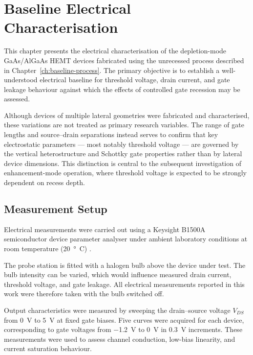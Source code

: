 \chapter{Baseline Electrical Characterisation}
\label{ch:baseline-electrical}

This chapter presents the electrical characterisation of the depletion-mode
GaAs/AlGaAs HEMT devices fabricated using the unrecessed process described
in Chapter~\ref{ch:baseline-process}. The primary objective is to establish
a well-understood electrical baseline for threshold voltage, drain current,
and gate leakage behaviour against which the effects of controlled gate
recession may be assessed.

\vspace{2mm}

Although devices of multiple lateral geometries were fabricated and
characterised, these variations are not treated as primary research variables.
The range of gate lengths and source--drain separations instead serves to
confirm that key electrostatic parameters --- most notably threshold voltage ---
are governed by the vertical heterostructure and Schottky gate properties
rather than by lateral device dimensions. This distinction is central to the
subsequent investigation of enhancement-mode operation, where threshold voltage
is expected to be strongly dependent on recess depth.

\section{Measurement Setup}
\label{sec:measurement-setup}

Electrical measurements were carried out using a Keysight B1500A
semiconductor device parameter analyser under ambient laboratory conditions at
room temperature (\SI{20}{\degree C}) \cite{leedscleanroom_equipment}.

\vspace{2mm}

The probe station is fitted with a halogen bulb above the device under test.
The bulb intensity can be varied, which would influence measured drain current,
threshold voltage, and gate leakage. All electrical measurements reported in
this work were therefore taken with the bulb switched off.

\vspace{2mm}

Output characteristics were measured by sweeping the drain--source voltage
$V_{DS}$ from \SI{0}{\volt} to \SI{5}{\volt} at fixed gate biases. Five curves
were acquired for each device, corresponding to gate voltages from
\SI{-1.2}{\volt} to \SI{0}{\volt} in \SI{0.3}{\volt} increments. These
measurements were used to assess channel conduction, low-bias linearity, and
current saturation behaviour.

